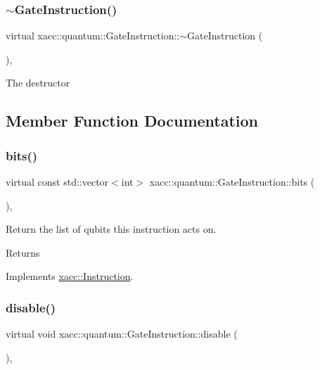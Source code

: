 \subsubsection{\texorpdfstring{$\sim$\+Gate\+Instruction()}{~GateInstruction()}}
{\footnotesize\ttfamily virtual xacc\+::quantum\+::\+Gate\+Instruction\+::$\sim$\+Gate\+Instruction (\begin{DoxyParamCaption}{ }\end{DoxyParamCaption})\hspace{0.3cm}{\ttfamily [inline]}, {\ttfamily [virtual]}}

The destructor 

\subsection{Member Function Documentation}
\mbox{\label{a01276_ad32ad03dfc516e00093030e60178003d}} 
\subsubsection{\texorpdfstring{bits()}{bits()}}
{\footnotesize\ttfamily virtual const std\+::vector$<$int$>$ xacc\+::quantum\+::\+Gate\+Instruction\+::bits (\begin{DoxyParamCaption}{ }\end{DoxyParamCaption})\hspace{0.3cm}{\ttfamily [inline]}, {\ttfamily [virtual]}}

Return the list of qubits this instruction acts on. \begin{DoxyReturn}{Returns}

\end{DoxyReturn}


Implements \hyperlink{a02460_a819f32e94c3e1c9e69a0061aaf8d86dc}{xacc\+::\+Instruction}.

\mbox{\label{a01276_a63ce138dd71fb43d303f5600fefb7215}} 
\subsubsection{\texorpdfstring{disable()}{disable()}}
{\footnotesize\ttfamily virtual void xacc\+::quantum\+::\+Gate\+Instruction\+::disable (\begin{DoxyParamCaption}{ }\end{DoxyParamCaption})\hspace{0.3cm}{\ttfamily [inline]}, {\ttfamily [virtual]}}

